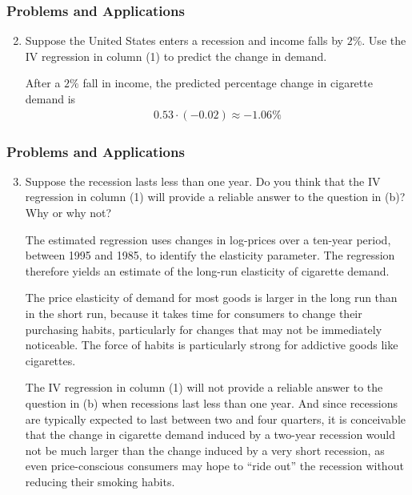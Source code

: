 \begin{frame}
\frametitle{Problems and Applications}

\begin{enumerate}\setcounter{enumi}{1}

\item Suppose the United States enters a recession and income falls by $2\%$. Use the IV regression in column (1) to predict the change in demand.

\begin{answer}
After a $2\%$ fall in income, the predicted percentage change in cigarette demand is
\begin{align*}
0.53 \cdot (-0.02) \approx -1.06\%
\end{align*}
\end{answer}

\end{enumerate}

\end{frame}


\begin{frame}
\frametitle{Problems and Applications}

\begin{enumerate}\setcounter{enumi}{2}

\item Suppose the recession lasts less than one year. Do you think that the IV regression in column (1) will provide a reliable answer to the question in (b)? Why or why not?

\begin{answer}
The estimated regression uses changes in log-prices over a ten-year period, between 1995 and 1985, to identify the elasticity parameter. The regression therefore yields an estimate of the long-run elasticity of cigarette demand. 

The price elasticity of demand for most goods is larger in the long run than in the short run, because it takes time for consumers to change their purchasing habits, particularly for changes that may not be immediately noticeable. The force of habits is particularly strong for addictive goods like cigarettes. 

The IV regression in column (1) will not provide a reliable answer to the question in (b) when recessions last less than one year. And since recessions are typically expected to last between two and four quarters, it is conceivable that the change in cigarette demand induced by a two-year recession would not be much larger than the change induced by a very short recession, as even price-conscious consumers may hope to ``ride out'' the recession without reducing their smoking habits.
\end{answer}

\end{enumerate}

\end{frame}


